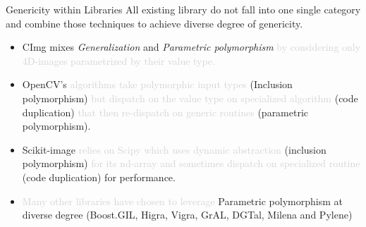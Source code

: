 \documentclass[12pt,aspectratio=169]{beamer}
\newcommand{\GRAYOUT}[1]{\textcolor{lightgray}{#1}}%
\begin{document}
\begin{frame}[fragile]{Genericity within Libraries}
  All existing library do not fall into one single category and combine those techniques to achieve diverse degree of
  genericity.
  \vspace{-0.2cm}\small\begin{itemize}
    \item CImg mixes \emph{Generalization} and \emph{Parametric polymorphism} \GRAYOUT{by considering only 4D-images
            parametrized by their value type.}
    \item OpenCV's \GRAYOUT{algorithms take polymorphic input types} (Inclusion polymorphism) \GRAYOUT{but dispatch on
            the value type on specialized algorithm} (code duplication) \GRAYOUT{that then re-dispatch on generic
            routines} (parametric polymorphism).
    \item Scikit-image \GRAYOUT{relies on Scipy which uses dynamic abstraction} (inclusion polymorphism) \GRAYOUT{for
            its nd-array and sometimes dispatch on specialized routine} (code duplication) for performance.
    \item \GRAYOUT{Many other libraries have chosen to leverage} Parametric polymorphism at diverse degree (Boost.GIL,
          Higra, Vigra, GrAL, DGTal, Milena and Pylene)
  \end{itemize}
  \pdfcomment[icon=Note]{   }
\end{frame}
\end{document}
